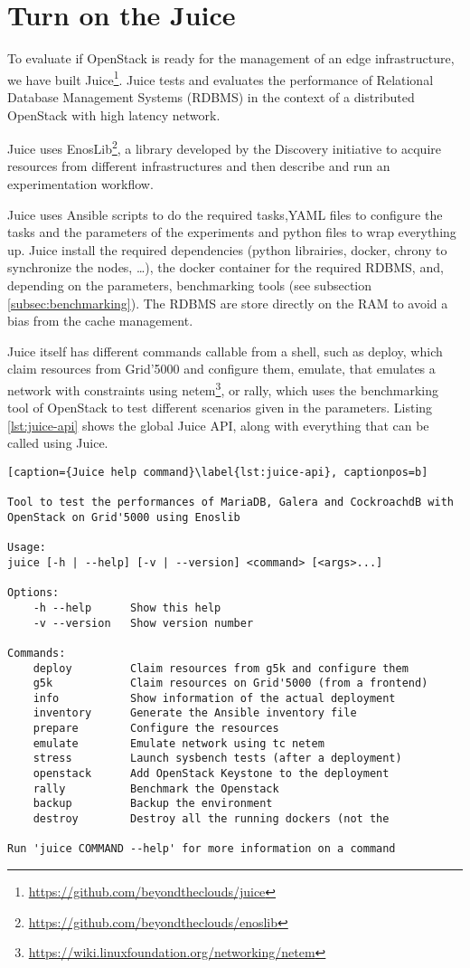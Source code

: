\section{Turn on the Juice}


To evaluate if OpenStack is ready for the management of an edge infrastructure, we have built Juice\footnote{\url{https://github.com/beyondtheclouds/juice}}. Juice tests and evaluates the performance of Relational Database Management Systems (RDBMS) in the context of a distributed OpenStack with high latency network.

Juice uses EnosLib\footnote{\url{https://github.com/beyondtheclouds/enoslib}}, a library developed by the Discovery initiative to acquire resources from different infrastructures and then describe and run an experimentation workflow.

Juice uses Ansible scripts to do the required tasks,YAML files to configure the tasks and the parameters of the experiments and python files to wrap everything up. Juice install the required dependencies (python librairies, docker, chrony to synchronize the nodes, \dots), the docker container for the required RDBMS, and, depending on the parameters, benchmarking tools (see subsection \ref{subsec:benchmarking}). The RDBMS are store directly on the RAM to avoid a bias from the cache management.

Juice itself has different commands callable from a shell, such as deploy, which claim resources from Grid'5000 and configure them, emulate, that emulates a network with constraints using netem\footnote{\url{https://wiki.linuxfoundation.org/networking/netem}}, or rally, which uses the benchmarking tool of OpenStack to test different scenarios given in the parameters. Listing \ref{lst:juice-api} shows the global Juice API, along with everything that can be called using Juice.

\begin{lstlisting}[caption={Juice help command}\label{lst:juice-api}, captionpos=b]

Tool to test the performances of MariaDB, Galera and CockroachdB with
OpenStack on Grid'5000 using Enoslib

Usage:
juice [-h | --help] [-v | --version] <command> [<args>...]

Options:
    -h --help      Show this help
    -v --version   Show version number

Commands:
    deploy         Claim resources from g5k and configure them
    g5k            Claim resources on Grid'5000 (from a frontend)
    info           Show information of the actual deployment
    inventory      Generate the Ansible inventory file
    prepare        Configure the resources
    emulate        Emulate network using tc netem
    stress         Launch sysbench tests (after a deployment)
    openstack      Add OpenStack Keystone to the deployment
    rally          Benchmark the Openstack
    backup         Backup the environment
    destroy        Destroy all the running dockers (not the

Run 'juice COMMAND --help' for more information on a command
\end{lstlisting}

